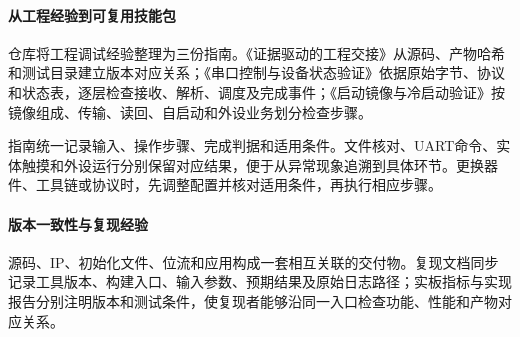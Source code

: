 \paragraph{从工程经验到可复用技能包}
仓库将工程调试经验整理为三份指南\cite{repo}。《证据驱动的工程交接》从源码、产物哈希和测试目录建立版本对应关系；《串口控制与设备状态验证》依据原始字节、协议和状态表，逐层检查接收、解析、调度及完成事件；《启动镜像与冷启动验证》按镜像组成、传输、读回、自启动和外设业务划分检查步骤。

指南统一记录输入、操作步骤、完成判据和适用条件。文件核对、UART命令、实体触摸和外设运行分别保留对应结果，便于从异常现象追溯到具体环节。更换器件、工具链或协议时，先调整配置并核对适用条件，再执行相应步骤。

\paragraph{版本一致性与复现经验}
源码、IP、初始化文件、位流和应用构成一套相互关联的交付物。复现文档同步记录工具版本、构建入口、输入参数、预期结果及原始日志路径；实板指标与实现报告分别注明版本和测试条件，使复现者能够沿同一入口检查功能、性能和产物对应关系。
